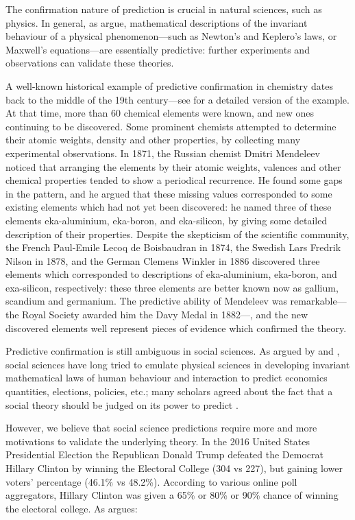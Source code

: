 \documentclass{statsoc}
\begin{document}
The confirmation nature of prediction is crucial in natural sciences, such as physics. In general,  as \cite{hitchcock2004prediction} argue,   mathematical descriptions of the 
invariant behaviour of a physical phenomenon---such as Newton's and Keplero's laws, or Maxwell's equations---are essentially predictive: further experiments and observations can validate these theories. 

A well-known historical example of predictive confirmation in chemistry dates back to the middle of the 19th century---see \cite{maher1988prediction} for a detailed version of the 
example. At that time, more than 60 chemical elements were known, and new ones continuing to be discovered. Some prominent chemists attempted to determine their atomic weights, 
density and other properties, by collecting many experimental observations. In 1871, the Russian chemist Dmitri Mendeleev noticed that arranging the elements by their atomic 
weights, valences and other chemical properties tended to show a periodical recurrence. He found some gaps in the pattern, and he argued that these missing values corresponded to 
some existing elements which had not yet been discovered: he named three of these elements eka-aluminium, eka-boron, and eka-silicon, by giving some detailed description of their 
properties. Despite the skepticism of the scientific community, the French Paul-Emile Lecoq de Boisbaudran in 1874, the Swedish Lars Fredrik Nilson in 1878, and the German Clemens 
Winkler in 1886 discovered three elements which corresponded to descriptions of eka-aluminium, eka-boron, and exa-silicon, respectively: these three elements are better known 
now as gallium, scandium and germanium. The predictive ability of Mendeleev was remarkable---the Royal Society awarded him the Davy Medal in 1882---, and the new discovered elements well represent pieces of evidence which confirmed the theory.

Predictive confirmation is still ambiguous in social sciences. As argued by \cite{popper1944poverty, popper1945poverty} and \cite{sarewitz1999prediction}, social sciences 
have long tried to emulate physical sciences in developing invariant mathematical laws of human behaviour and interaction to predict economics quantities, elections, policies, etc.; 
many scholars agreed about the fact that a social theory should be judged on its power to predict \citep{friedman1953essays}. 

However, we believe that social science predictions require more and more motivations to validate the underlying theory. In the 2016 United States Presidential Election the Republican Donald Trump defeated the Democrat Hillary Clinton by winning the Electoral College (304 vs 227), but gaining lower voters' percentage (46.1\% vs 48.2\%). According to various online poll aggregators, Hillary Clinton was given a 65\% or 80\% or 90\% chance of winning the electoral college.  As \cite{gelman2016elections} argues:
\end{document}
